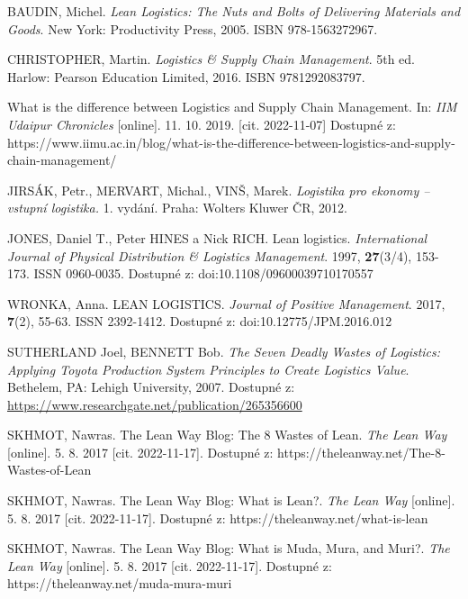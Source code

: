 



\begin{thebibliography}{1}

BAUDIN, Michel. \textit{Lean Logistics: The Nuts and Bolts of Delivering Materials and Goods}. New York: Productivity Press, 2005. ISBN 978-1563272967.

CHRISTOPHER, Martin. \textit{Logistics \& Supply Chain Management}. 5th ed. Harlow: Pearson Education Limited, 2016. ISBN 9781292083797.

What is the difference between Logistics and Supply Chain Management. In: \textit{IIM Udaipur Chronicles} [online]. 11. 10. 2019. [cit. 2022-11-07] Dostupné z: https://www.iimu.ac.in/blog/what-is-the-difference-between-logistics-and-supply-chain-management/

JIRSÁK, Petr., MERVART, Michal., VINŠ, Marek. \textit{Logistika pro ekonomy -- vstupní logistika.} 1. vydání. Praha: Wolters Kluwer ČR, 2012.

JONES, Daniel T., Peter HINES a Nick RICH. Lean logistics. \textit{International Journal of Physical Distribution \& Logistics Management}. 1997, \textbf{27}(3/4), 153-173. ISSN 0960-0035. Dostupné z: doi:10.1108/09600039710170557

WRONKA, Anna. LEAN LOGISTICS. \textit{Journal of Positive Management}. 2017, \textbf{7}(2), 55-63. ISSN 2392-1412. Dostupné z: doi:10.12775/JPM.2016.012

SUTHERLAND Joel, BENNETT Bob. \textit{The Seven Deadly Wastes of Logistics: Applying Toyota Production System Principles to Create Logistics Value}. Bethelem, PA: Lehigh University, 2007. Dostupné z: \url{https://www.researchgate.net/publication/265356600}

SKHMOT, Nawras. The Lean Way Blog: The 8 Wastes of Lean. \textit{The Lean Way} [online]. 5. 8. 2017 [cit. 2022-11-17]. Dostupné z: https://theleanway.net/The-8-Wastes-of-Lean

SKHMOT, Nawras. The Lean Way Blog: What is Lean?. \textit{The Lean Way} [online]. 5. 8. 2017 [cit. 2022-11-17]. Dostupné z: https://theleanway.net/what-is-lean

SKHMOT, Nawras. The Lean Way Blog: What is Muda, Mura, and Muri?. \textit{The Lean Way} [online]. 5. 8. 2017 [cit. 2022-11-17]. Dostupné z:
https://theleanway.net/muda-mura-muri


\end{thebibliography}
	

	
	